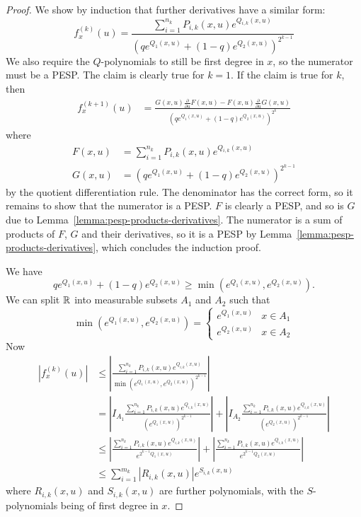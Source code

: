 \documentclass{article}
\theoremstyle{plain}
\theoremstyle{definition}
\theoremstyle{remark}
\begin{document}
\begin{proof}
    We show by induction that further derivatives have a similar form:
    \begin{equation}
        f_x^{(k)}(u) = \frac{\sum_{i=1}^{n_k} P_{i,k}(x, u)e^{Q_{i,k}(x, u)}}{(qe^{Q_1(x, u)} + (1 - q)e^{Q_2(x, u)})^{2^{k-1}}}
    \end{equation}
    We also require the $Q$-polynomials to still be first degree in $x$, so the numerator 
    must be a PESP. The claim is clearly true for $k = 1$. If the claim is true for $k$, then 
    \begin{align}
        f_x^{(k+1)}(u) 
        &= \frac{G(x, u)\frac{\partial}{\partial u}F(x, u) - F(x, u)\frac{\partial}{\partial u}G(x, u)}
        {(qe^{Q_1(x, u)} + (1 - q)e^{Q_2(x, u)})^{2^{k}}}
    \end{align}
    where 
    \begin{align}
        F(x, u) &= \sum_{i=1}^{n_k} P_{i,k}(x, u)e^{Q_{i,k}(x, u)} \\
        G(x, u) &= (qe^{Q_1(x, u)}  + (1 - q)e^{Q_2(x, u)})^{2^{k-1}}
    \end{align}
    by the quotient differentiation rule. The denominator has the correct form, so it remains
    to show that the numerator is a PESP. $F$ is clearly a PESP, and so is $G$ due to 
    Lemma~\ref{lemma:pesp-products-derivatives}. The numerator is a sum of products of 
    $F$, $G$ and their derivatives, so it is a PESP by Lemma~\ref{lemma:pesp-products-derivatives},
    which concludes the induction proof.

    We have
    \begin{equation}
        qe^{Q_1(x, u)} + (1 - q)e^{Q_2(x, u)} \geq \min\left(e^{Q_1(x, u)}, e^{Q_2(x, u)}\right).
    \end{equation}
    We can split $\mathbb{R}$ into measurable subsets $A_1$ and $A_2$ such that 
    \begin{equation}
        \min\left(e^{Q_1(x, u)}, e^{Q_2(x, u)}\right) = 
        \begin{cases}
            e^{Q_1(x, u)} & x\in A_1 \\
            e^{Q_2(x, u)} & x \in A_2
        \end{cases}
    \end{equation}
    Now
    \begin{align}
        |f_x^{(k)}(u)|
        &\leq \left|\frac{\sum_{i=1}^{n_k} P_{i,k}(x, u)e^{Q_{i,k}(x,u)}}{\min\left(e^{Q_1(x,u)}, e^{Q_2(x,u)}\right)^{2^{k-1}}}\right|
        \\&= \left|I_{A_1}\frac{\sum_{i=1}^{n_k} P_{i,k}(x, u)e^{Q_{i,k}(x,u)}}{(e^{Q_1(x,u)})^{2^{k-1}}}\right|
        + \left|I_{A_2}\frac{\sum_{i=1}^{n_k} P_{i,k}(x, u)e^{Q_{i,k}(x,u)}}{(e^{Q_2(x,u)})^{2^{k-1}}}\right|
        \\&\leq \left|\frac{\sum_{i=1}^{n_k} P_{i,k}(x, u)e^{Q_{i,k}(x,u)}}{e^{{2^{k-1}} Q_1(x,u)}}\right|
        + \left|\frac{\sum_{i=1}^{n_k} P_{i,k}(x, u)e^{Q_{i,k}(x,u)}}{e^{{2^{k-1} Q_2(x,u)}}}\right|
        \\&\leq \sum_{i=1}^{m_k} |R_{i,k}(x, u)|e^{S_{i,k}(x, u)}
    \end{align}
    where $R_{i,k}(x,u)$ and $S_{i,k}(x,u)$ are further polynomials, with the $S$-polynomials being of 
    first degree in $x$.


\end{proof}
\end{document}
